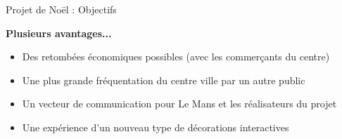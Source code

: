 \documentclass[10pt, compress]{beamer}
\begin{document}
\begin{frame}[fragile]{Projet de Noël : Objectifs}

	\textbf{Plusieurs avantages...}

	\pause

	\begin{itemize}[<+->]
		\item Des \alert{retombées économiques} possibles (avec les commerçants du centre)
		\item Une plus grande \alert{fréquentation} du centre ville par un \alert{autre public}
		\item Un vecteur de \alert{communication} pour Le Mans et les réalisateurs du projet
		\item Une \alert{expérience} d'un nouveau type de \alert{décorations interactives}
	\end{itemize}
\end{frame}

\end{document}

